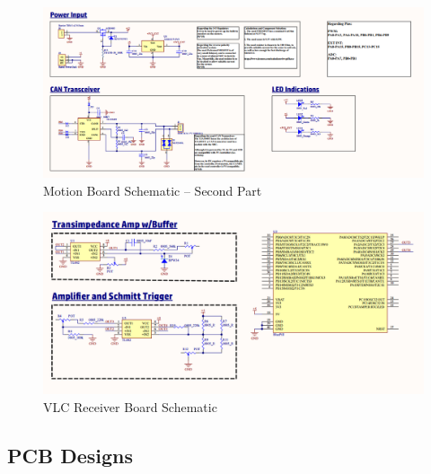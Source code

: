 \begin{figure}[h!]
	\centering
	\includegraphics[scale=0.4]{Figures/HW/schem-motor-2.png}
	\caption{Motion Board Schematic -- Second Part}
	\label{fig:hw-motion-schem-2}
\end{figure}


\begin{figure}[h!]
	\centering
	\includegraphics[scale=0.4]{Figures/HW/schem-vlc.png}
	\caption{VLC Receiver Board Schematic}
	\label{fig:hw-vlc-schem-}
\end{figure}


\newpage


\subsection{PCB Designs}

\vspace{3mm}

